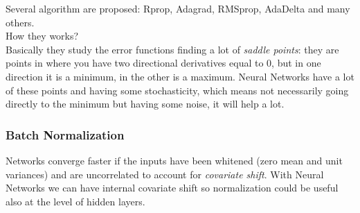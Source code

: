 Several algorithm are proposed: Rprop, Adagrad, RMSprop, AdaDelta and many others. \\
How they works? \\
Basically they study the error functions finding a lot of \textit{saddle points}: they are points in where you have two directional derivatives equal to 0, but in one direction it is a minimum, in the other is a maximum. Neural Networks have a lot of these points and having some stochasticity, which means not necessarily going directly to the minimum but having some noise, it will help a lot.


\subsubsection{Batch Normalization}
Networks converge faster if the inputs have been whitened (zero mean and unit variances) and are uncorrelated to account for \textit{covariate shift}. With Neural Networks we can have internal covariate shift so normalization could be useful also at the level of hidden layers.

